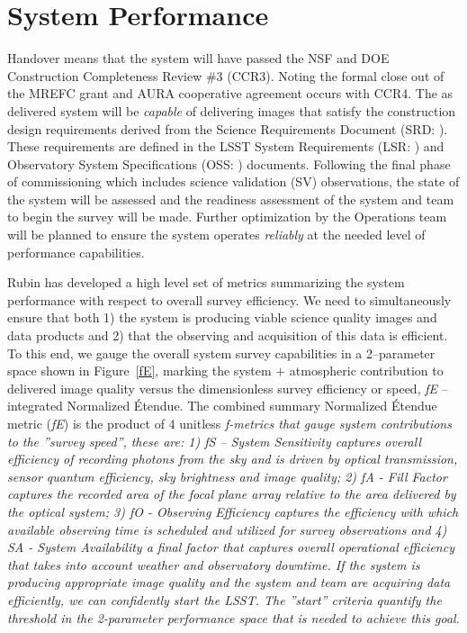 \section{System Performance}{\label{secSysperf}}
  
Handover means that the system will have passed the NSF and DOE Construction Completeness Review \#3 (CCR3).  Noting the formal close out of the MREFC grant and AURA cooperative agreement occurs with CCR4. The as delivered system will be {\it capable} of delivering images that satisfy the construction design requirements derived from the Science Requirements Document (SRD: \cite{LPM-17}).  These requirements are defined in the LSST System Requirements (LSR: \cite{LSE-29}) and Observatory System Specifications (OSS: \cite{LSE-30}) documents. Following the final phase of commissioning which includes science validation (SV) observations, the state of the system will be assessed and the readiness assessment of the system and team to begin the survey will be made. Further optimization by the Operations team will be planned to ensure the system operates {\it reliably} at the needed level of performance capabilities. 

Rubin has developed a high level set of metrics summarizing the system performance with respect to overall survey efficiency. We need to simultaneously ensure that both 1) the system is producing viable science quality images and data products and 2) that the observing and acquisition of this data is efficient.  To this end, we gauge the overall system survey capabilities in a 2--parameter space shown in Figure~\ref{fE}, marking the system $+$ atmospheric contribution to delivered image quality versus the dimensionless survey efficiency or speed, {\it fE} -- integrated Normalized \'{E}tendue.  The combined summary Normalized \'{E}tendue metric ({\it fE}) is the product of 4 unitless \it{f-metrics} that gauge system contributions to the ''survey speed'', these are: 1) { \it fS -- System Sensitivity} captures overall efficiency of recording photons from the sky and is driven by optical transmission, sensor quantum efficiency, sky brightness and image quality; 2) {\it fA - Fill Factor} captures the recorded area of the focal plane array relative to the area delivered by the optical system; 3) {\it fO - Observing Efficiency} captures the efficiency with which available observing time is scheduled and utilized for survey observations and 4) {\it SA - System Availability} a final factor that captures overall operational efficiency that takes into account weather and observatory downtime.   If the system is producing appropriate image quality and the system and team are acquiring data efficiently, we can confidently start the LSST.  The ''start'' criteria quantify the threshold in the 2-parameter performance space that is needed to achieve this goal.

